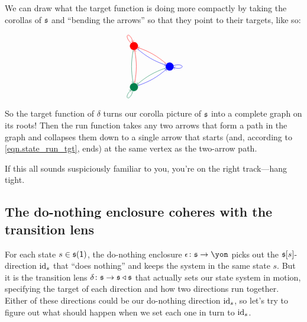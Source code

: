 \documentclass[Book-Poly]{subfiles}
\begin{document}
\begin{example}
We can draw what the target function is doing more compactly by taking the corollas of $\mathfrak{s}$ and ``bending the arrows'' so that they point to their targets, like so:
\[
\begin{tikzpicture}
    \node[circle,minimum size=2cm] (b) {};
    \foreach\x/\c in {1/red, 2/dgreen, 3/blue} {
        \node[minimum size=0.1cm,draw,circle,\c,fill=\c] (3-\x) at (b.{360/3*\x}){};
    }
    \foreach\x/\c in {1/red, 2/dgreen, 3/blue} {
        \foreach\y/\d in {1/red, 2/dgreen, 3/blue}{
            \ifnum\x=\y
                \draw[\d,->] (3-\x) to [in=360/3*\x-15,out=360/3*\x+15,loop] ();
                \relax
            \else
                \draw[\d] (3-\x) edge[->,bend right=10] (3-\y);
            \fi
        }
    }
\end{tikzpicture}
\]
So the target function of $\delta$ turns our corolla picture of $\mathfrak{s}$ into a complete graph on its roots!
Then the run function takes any two arrows that form a path in the graph and collapses them down to a single arrow that starts (and, according to \eqref{eqn.state_run_tgt}, ends) at the same vertex as the two-arrow path.

If this all sounds suspiciously familiar to you, you're on the right track---hang tight.
\end{example}

\subsection{The do-nothing enclosure coheres with the transition lens}\label{subsec.comon.sharp.state.cohere}

For each state $s\in\mathfrak{s}(\textsf{1})$, the do-nothing enclosure $\epsilon\colon\car{s}\to\yon$ picks out the $\mathfrak{s}[s]$-direction $\mathrm{id}_s$ that ``does nothing'' and keeps the system in the same state $s$.
But it is the transition lens $\delta\colon\mathfrak{s}\to\mathfrak{s}\mathbin{\triangleleft}\mathfrak{s}$ that actually sets our state system in motion, specifying the target of each direction and how two directions run together.
Either of these directions could be our do-nothing direction $\mathrm{id}_s$, so let's try to figure out what should happen when we set each one in turn to $\mathrm{id}_s$.
\end{document}
